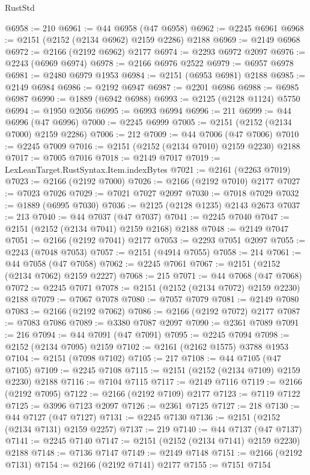 \begin{lexlean}{RustStd}
\begin{coremodule}
@6958 := 210
@6961 := @44 @6958 (@47 @6958)
@6962 := @2245 @6961
@6968 := @2151 (@2152 (@2134 @6962) @2159 @2286) @2188
@6969 := @2149 @6968
@6972 := @2166 (@2192 @6962) @2177
@6974 := @2293 @6972 @2097
@6976 := @2243 (@6969 @6974)
@6978 := @2166 @6976 @2522
@6979 := @6957 @6978
@6981 := @2480 @6979 @1953
@6984 := @2151 (@6953 @6981) @2188
@6985 := @2149 @6984
@6986 := @2192 @6947
@6987 := @2201 @6986
@6988 := @6985 @6987
@6990 := @1889 (@6942 @6988)
@6993 := @2125 (@2128 @1124) @5750
@6994 := @1950 @2056
@6995 := @6993 @6994
@6996 := 211
@6999 := @44 @6996 (@47 @6996)
@7000 := @2245 @6999
@7005 := @2151 (@2152 (@2134 @7000) @2159 @2286)
@7006 := 212
@7009 := @44 @7006 (@47 @7006)
@7010 := @2245 @7009
@7016 := @2151 (@2152 (@2134 @7010) @2159 @2230) @2188
@7017 := @7005 @7016
@7018 := @2149 @7017
@7019 := LexLeanTarget.RustSyntax.Item.indexBytes
@7021 := @2161 (@2263 @7019)
@7023 := @2166 (@2192 @7000)
@7026 := @2166 (@2192 @7010) @2177
@7027 := @7023 @7026
@7029 := @7021 @7027 @2097
@7030 := @7018 @7029
@7032 := @1889 (@6995 @7030)
@7036 := @2125 (@2128 @1235) @2143 @2673
@7037 := 213
@7040 := @44 @7037 (@47 @7037)
@7041 := @2245 @7040
@7047 := @2151 (@2152 (@2134 @7041) @2159 @2168) @2188
@7048 := @2149 @7047
@7051 := @2166 (@2192 @7041) @2177
@7053 := @2293 @7051 @2097
@7055 := @2243 (@7048 @7053)
@7057 := @2151 (@4914 @7055)
@7058 := 214
@7061 := @44 @7058 (@47 @7058)
@7062 := @2245 @7061
@7067 := @2151 (@2152 (@2134 @7062) @2159 @2227)
@7068 := 215
@7071 := @44 @7068 (@47 @7068)
@7072 := @2245 @7071
@7078 := @2151 (@2152 (@2134 @7072) @2159 @2230) @2188
@7079 := @7067 @7078
@7080 := @7057 @7079
@7081 := @2149 @7080
@7083 := @2166 (@2192 @7062)
@7086 := @2166 (@2192 @7072) @2177
@7087 := @7083 @7086
@7089 := @3380 @7087 @2097
@7090 := @2361 @7089
@7091 := 216
@7094 := @44 @7091 (@47 @7091)
@7095 := @2245 @7094
@7098 := @2152 (@2134 @7095) @2159
@7102 := @2161 (@2162 @1575) @3788 @1953
@7104 := @2151 (@7098 @7102)
@7105 := 217
@7108 := @44 @7105 (@47 @7105)
@7109 := @2245 @7108
@7115 := @2151 (@2152 (@2134 @7109) @2159 @2230) @2188
@7116 := @7104 @7115
@7117 := @2149 @7116
@7119 := @2166 (@2192 @7095)
@7122 := @2166 (@2192 @7109) @2177
@7123 := @7119 @7122
@7125 := @3996 @7123 @2097
@7126 := @2361 @7125
@7127 := 218
@7130 := @44 @7127 (@47 @7127)
@7131 := @2245 @7130
@7136 := @2151 (@2152 (@2134 @7131) @2159 @2257)
@7137 := 219
@7140 := @44 @7137 (@47 @7137)
@7141 := @2245 @7140
@7147 := @2151 (@2152 (@2134 @7141) @2159 @2230) @2188
@7148 := @7136 @7147
@7149 := @2149 @7148
@7151 := @2166 (@2192 @7131)
@7154 := @2166 (@2192 @7141) @2177
@7155 := @7151 @7154

\end{coremodule}
\end{lexlean}
